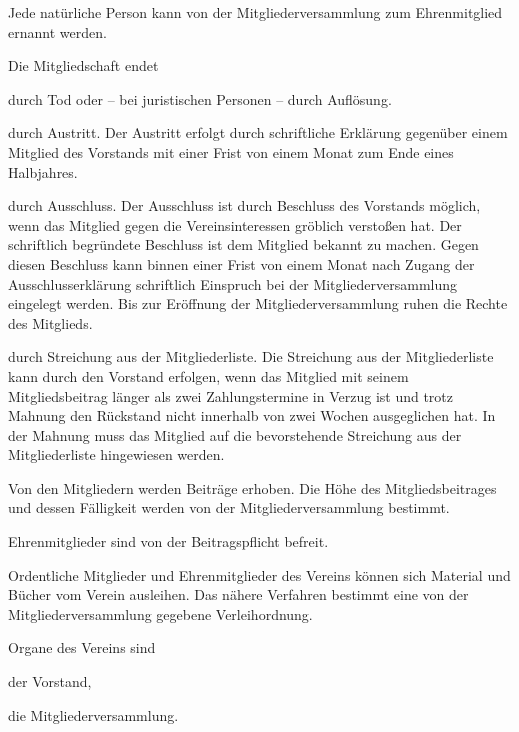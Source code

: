 \begin{contract}
 Jede natürliche Person kann von der Mitgliederversammlung zum Ehrenmitglied ernannt werden.


Die Mitgliedschaft endet

	\begin{subpara}
	\item durch Tod oder – bei juristischen Personen – durch Auflösung.
	\item durch Austritt.
	Der Austritt erfolgt durch schriftliche Erklärung gegenüber einem Mitglied des Vorstands mit einer Frist von einem Monat zum Ende eines Halbjahres.
	\item durch Ausschluss.
	Der Ausschluss ist durch Beschluss des Vorstands möglich, wenn das Mitglied gegen die Vereinsinteressen gröblich verstoßen hat. Der schriftlich begründete Beschluss ist dem Mitglied bekannt zu machen.
	Gegen diesen Beschluss kann binnen einer Frist von einem Monat nach Zugang der Ausschlusserklärung schriftlich Einspruch bei der Mitgliederversammlung eingelegt werden. Bis zur Eröffnung der Mitgliederversammlung ruhen die Rechte des Mitglieds.
	\item durch Streichung aus der Mitgliederliste.
	Die Streichung aus der Mitgliederliste kann durch den Vorstand erfolgen, wenn das Mitglied mit seinem Mitgliedsbeitrag länger als zwei Zahlungstermine in Verzug ist und trotz Mahnung den Rückstand nicht innerhalb von zwei Wochen ausgeglichen hat. In der Mahnung muss das Mitglied auf die bevorstehende Streichung aus der Mitgliederliste hingewiesen werden.
	\end{subpara}

	
 Von den Mitgliedern werden Beiträge erhoben. Die Höhe des Mitgliedsbeitrages und dessen Fälligkeit werden von der Mitgliederversammlung bestimmt.
	
 Ehrenmitglieder sind von der Beitragspflicht befreit.

	
Ordentliche Mitglieder und Ehrenmitglieder des Vereins können sich Material und Bücher vom Verein ausleihen. Das nähere Verfahren bestimmt eine von der Mitgliederversammlung gegebene Verleihordnung.

Organe des Vereins sind
	\begin{subpara}
	\item der Vorstand,
	\item die Mitgliederversammlung.
	\end{subpara}


\end{contract}
